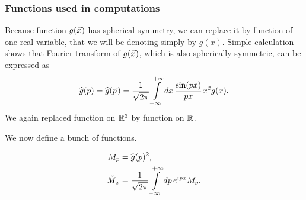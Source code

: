 \documentclass[10pt,t]{beamer}
\begin{document}
\begin{frame}
  \frametitle{Functions used in computations}


  Because function $g( \vec{x} )$ has spherical symmetry, we can replace it
  by function of one real variable, that we will be denoting simply
  by $g( x )$. Simple calculation shows that Fourier transform of
  $g( \vec{x} )$,
  which is also spherically symmetric, can be expressed as
  \begin{equation}
    \label{eq:Scalar-field-and-two-quasi-deltas-04}
    \widehat{g}( p ) = \widehat{g}( \vec{p} \hspace{0.1em} ) =
    \frac{ 1 }{ \sqrt{ 2 \pi } }
    \int\limits_{ -\infty }^{ +\infty } dx \, \frac{ \sin( p x ) }{ p x }
    \hspace{0.07em} x^{ 2 } g( x ).
  \end{equation}
  We again replaced function on $\mathbb{R}^{ 3 }$ by function on $\mathbb{R}$.

  We now define a bunch of functions.

  \vspace{-2em}



  \begin{subequations}

    \begin{align}
      \label{eq:Scalar-field-and-two-quasi-deltas-06-A}
      M_{ p }
      &= \widehat{g}( p )^{ 2 }, \\
      \label{eq:Scalar-field-and-two-quasi-deltas-06-B}
      \check{M}_{ \hspace{0.07em} x }
      &=
        \frac{ 1 }{ \sqrt{ 2 \pi } }
        \int\limits_{ -\infty }^{ +\infty } dp \, e^{ i p x } M_{ p }.
    \end{align}

  \end{subequations}

\end{frame}
\end{document}
